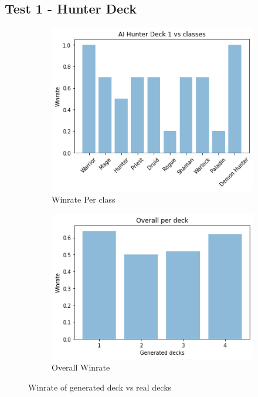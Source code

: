 \documentclass{report} %
\begin{document}
\subsection{Test 1 - Hunter Deck}
\begin{figure}[H]
\centering
\begin{subfigure}{.5\textwidth}
  \centering
  \includegraphics[width=1\linewidth]{TestImages/HunterDeckWinrateClasses}
  \caption{Winrate Per class}
\end{subfigure}%
\begin{subfigure}{.5\textwidth}
  \centering
  \includegraphics[width=1\linewidth]{TestImages/HunterAllGeneratedDeckOverallWinrate}
  \caption{Overall Winrate}
\end{subfigure}
\caption{Winrate of generated deck vs real decks}
\end{figure}
\end{document}
